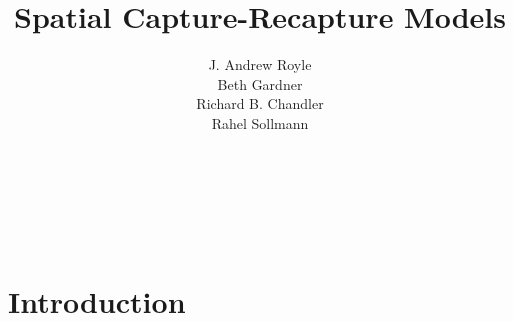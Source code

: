 \documentclass[dvips]{book}
\theoremstyle{plain}
\theoremstyle{definition}
\theoremstyle{remark}
\begin{document}
\title{
Spatial Capture-Recapture Models
}
\subtitle{
}
\author{J. Andrew Royle \\
Beth Gardner \\ 
Richard B. Chandler \\ Rahel Sollmann}

\address{
USGS Patuxent Wildlife Research Center \\
North Carolina State University
}

\maketitle


\setcounter{tocdepth}{2}
\tableofcontents

\newpage

\hspace*{-.166in}{\LARGE Preface} \\

\vspace*{.2in}

%

\newpage

\hspace*{-.166in}{\LARGE Acknowledgements} \\

\vspace*{.2in}

%

\mainmatter




\chapter{Introduction}
\label{chapt.intro}




\end{document}
